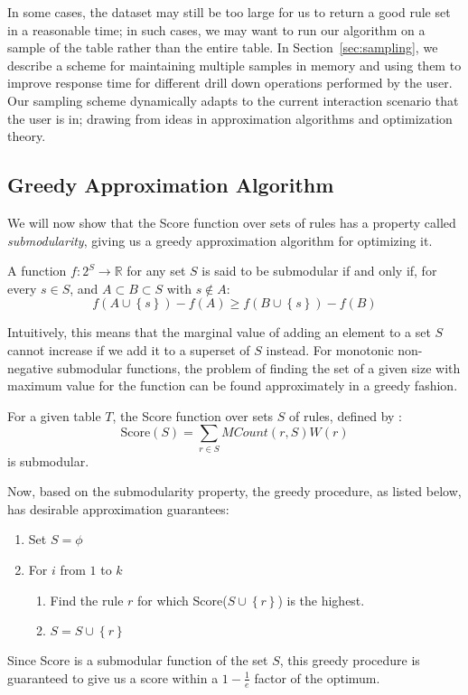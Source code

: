 In some cases, the dataset may still be too large for us to return a good rule set in
a reasonable time; in such cases, we may want to run our algorithm on a sample of the table
rather than the entire table. In Section~\ref{sec:sampling}, we describe a scheme 
for maintaining multiple samples in memory and using them to improve response 
time for different drill down operations performed by the user. Our sampling scheme dynamically adapts to the current interaction scenario that the user is in; drawing from ideas in approximation algorithms and optimization theory.

\subsection{Greedy Approximation Algorithm}\label{sec:greedy-approx}
 We will now show that the Score function over sets of rules has a property called {\em submodularity}, giving us a greedy approximation algorithm for optimizing it. 
\begin{definition}
A function $f: 2^S \rightarrow \mathbb{R}$ for any set $S$ is said to be submodular if and only if, for every $s \in S$, and $A \subset B \subset S$ with $s \notin A$:
$$f(A \cup \left\lbrace s \right\rbrace) - f(A) \geq f(B \cup \left\lbrace s \right\rbrace) - f(B)$$
\end{definition}
Intuitively, this means that the marginal value of adding an element to a set $S$ cannot increase if we add it to a superset of $S$ instead. For monotonic non-negative submodular functions, the problem of finding the set of a given size with maximum value for the function can be found approximately in a greedy fashion. 

\begin{lemma}\label{lemma:submodular}
For a given table $T$, the Score function over sets $S$ of rules, defined by :
$$\text{Score}(S) = \sum_{r \in S} MCount(r,S)W(r)$$
is submodular.
\end{lemma}

 Now, based on the submodularity property, the greedy procedure,
as listed below, has desirable approximation guarantees:
\begin{framed}
\vspace{-15pt}
\begin{enumerate}
\item Set $S = \phi$
\item For $i$ from $1$ to $k$
\begin{enumerate}
\item Find the rule $r$ for which Score($S \cup \left\lbrace r \right\rbrace$) is the highest.
\item $S = S \cup \left\lbrace r \right\rbrace$
\end{enumerate}
\end{enumerate}
\vspace{-15pt}
\end{framed}
Since Score is a submodular function of the set $S$, 
this greedy procedure is guaranteed to give us a score within a $1 - \frac{1}{e}$ factor of the optimum. 

